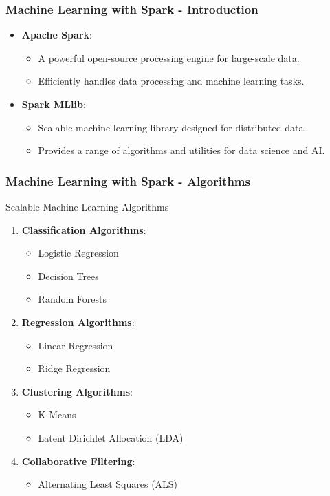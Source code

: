 \documentclass[aspectratio=169]{beamer}
\begin{document}
\begin{frame}[fragile]
    \frametitle{Machine Learning with Spark - Introduction}
    \begin{itemize}
        \item \textbf{Apache Spark}:
        \begin{itemize}
            \item A powerful open-source processing engine for large-scale data.
            \item Efficiently handles data processing and machine learning tasks.
        \end{itemize}
        \item \textbf{Spark MLlib}:
        \begin{itemize}
            \item Scalable machine learning library designed for distributed data.
            \item Provides a range of algorithms and utilities for data science and AI.
        \end{itemize}
    \end{itemize}
\end{frame}

\begin{frame}[fragile]
    \frametitle{Machine Learning with Spark - Algorithms}
    \begin{block}{Scalable Machine Learning Algorithms}
        \begin{enumerate}
            \item \textbf{Classification Algorithms}:
                \begin{itemize}
                    \item Logistic Regression
                    \item Decision Trees
                    \item Random Forests
                \end{itemize}
            \item \textbf{Regression Algorithms}:
                \begin{itemize}
                    \item Linear Regression
                    \item Ridge Regression
                \end{itemize}
            \item \textbf{Clustering Algorithms}:
                \begin{itemize}
                    \item K-Means
                    \item Latent Dirichlet Allocation (LDA)
                \end{itemize}
            \item \textbf{Collaborative Filtering}:
                \begin{itemize}
                    \item Alternating Least Squares (ALS)
                \end{itemize}
        \end{enumerate}
    \end{block}
\end{frame}
\end{document}
